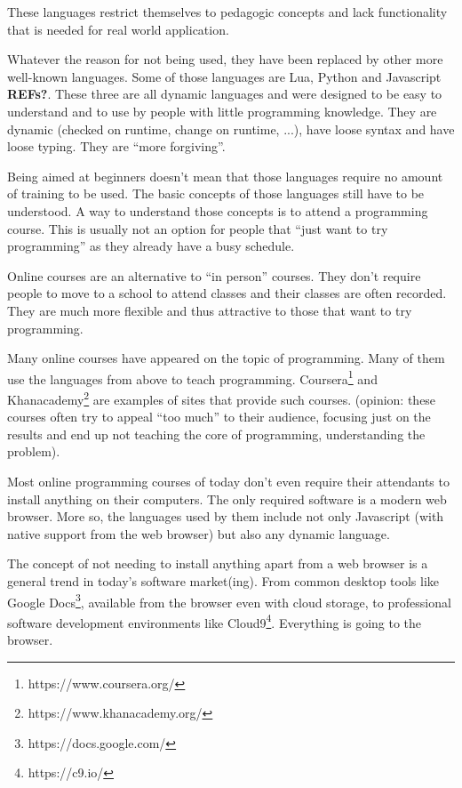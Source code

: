 \documentclass{./llncs2e/llncs}
\begin{document}
	These languages restrict themselves to pedagogic concepts and lack functionality that is needed for real world application.

	Whatever the reason for not being used, they have been replaced by other more well-known languages. Some of those languages are Lua, Python and Javascript \textbf{REFs?}. These three are all dynamic languages and were designed to be easy to understand and to use by people with little programming knowledge. They are dynamic (checked on runtime, change on runtime, ...), have loose syntax and have loose typing. They are ``more forgiving''.

	Being aimed at beginners doesn't mean that those languages require no amount of training to be used. The basic concepts of those languages still have to be understood. A way to understand those concepts is to attend a programming course. This is usually not an option for people that ``just want to try programming'' as they already have a busy schedule.

	Online courses are an alternative to ``in person'' courses. They don't require people to move to a school to attend classes and their classes are often recorded. They are much more flexible and thus attractive to those that want to try programming.

	Many online courses have appeared on the topic of programming. Many of them use the languages from above to teach programming. Coursera\footnote{https://www.coursera.org/} and Khanacademy\footnote{https://www.khanacademy.org/} are examples of sites that provide such courses. (opinion: these courses often try to appeal ``too much'' to their audience, focusing just on the results and end up not teaching the core of programming, understanding the problem).

	Most online programming courses of today don't even require their attendants to install anything on their computers. The only required software is a modern web browser. More so, the languages used by them include not only Javascript (with native support from the web browser) but also any dynamic language.

	The concept of not needing to install anything apart from a web browser is a general trend in today's software market(ing). From common desktop tools like Google Docs\footnote{https://docs.google.com/}, available from the browser even with cloud storage, to professional software development environments like Cloud9\footnote{https://c9.io/}. Everything is going to the browser.
\end{document}
